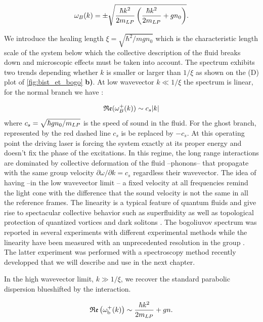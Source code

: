 \begin{equation}
    \omega_B(k) = \pm \sqrt{\dfrac{\hbar k^2}{2m_{LP}} \left({\dfrac{\hbar k^2}{2m_{LP}}} + g n_0 \right)}.
\end{equation}

We introduce the healing length $\xi=\sqrt{\hbar^2/mgn_0}$ which is the characteristic length scale of the system below which the collective description of the fluid breaks down and microscopic effects
must be taken into account. The spectrum exhibits two trends depending whether $k$ is smaller or larger than $1/\xi$ as shown on the (D) plot of \autoref{fig:bist_et_bogo} \textbf{b)}. At low wavevector $k \ll 1/ \xi$ the spectrum is linear, for the normal branch we have :

\begin{equation}
    \mathfrak{Re}(\omega^+_B(k)) \sim c_s\abs{k}
\end{equation}
where $c_s = \sqrt{\hbar g n_0/m_{LP}}$ is the speed of sound in the fluid. For the ghost branch, represented by the red dashed line $c_s$ is be replaced by $-c_s$. At this operating point the driving laser is forcing the system exactly at its proper energy and 
doesn't fix the phase of the excitations. In this regime, the long range interactions are dominated by collective deformation of the fluid --phonons-- that propagate with the same group velocity $\partial\omega/\partial k =c_s$ regardless their wavevector. 
The idea of having --in the low wavevector limit -- a fixed velocity at all frequencies remind the light cone with the difference that the sound velocity is not the same in all the reference frames.
The linearity is a typical feature of quantum fluids and give rise to spectacular collective behavior such as superfluidity \cite{Amo_fluidlightexp_2009} as well as topological protection of quantized vortices and dark solitons \cite{maitre_thesis}.
The bogoliuvov spectrum was reported in several experiments \cite{utsunomiya_observation_2008,stepanov_dispersion_2019} with different experimental methods while the linearity have been measured with 
an unprecedented resolution in the group \cite{claude_high-resolution_2022}. The latter experiment was performed with a spectroscopy method recently developped \cite{claude_prb} that we will describe and use in the next chapter.

\bigskip

In the high wavevector limit, $k \gg 1/\xi $, we recover the standard parabolic dispersion blueshifted by the interaction.

\begin{equation}
    \mathfrak{Re}\left(\omega_{\mathrm{b}}^+(k)\right) \sim \dfrac{\hbar k^2}{2m_{LP}} + g n.
\end{equation}

